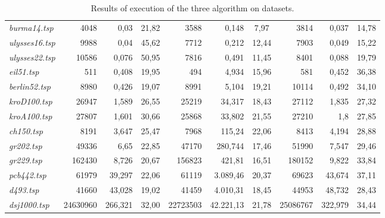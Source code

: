 \begin{landscape}
\begin{table}
\begin{tabular}{|l|r|r|c|r|r|c|r|r|c|}
    \textit{burma14.tsp}	& 4048	    & 0,03	    & 21,82 	& 3588	    & 0,148	    & 7,97      & 3814	    & 0,037	    & 14,78 \\
    \textit{ulysses16.tsp}	& 9988	    & 0,04	    & 45,62 	& 7712	    & 0,212	    & 12,44 	& 7903	    & 0,049	    & 15,22 \\
    \textit{ulysses22.tsp}	& 10586	    & 0,076	    & 50,95     & 7816	    & 0,491	    & 11,45     & 8401	    & 0,088	    & 19,79 \\
    \textit{eil51.tsp}	    & 511	    & 0,408	    & 19,95 	& 494	    & 4,934	    & 15,96 	& 581	    & 0,452	    & 36,38 \\
    \textit{berlin52.tsp}	& 8980	    & 0,426	    & 19,07 	& 8991	    & 5,104	    & 19,21 	& 10114	    & 0,492	    & 34,10 \\
    \textit{kroD100.tsp}    & 26947	    & 1,589	    & 26,55 	& 25219	    & 34,317	& 18,43 	& 27112	    & 1,835	    & 27,32 \\    
    \textit{kroA100.tsp}	& 27807	    & 1,601	    & 30,66 	& 25868	    & 33,802	& 21,55 	& 27210	    & 1,8       & 27,85 \\
    \textit{ch150.tsp}	    & 8191	    & 3,647	    & 25,47 	& 7968	    & 115,24	& 22,06 	& 8413	    & 4,194 	& 28,88 \\
    \textit{gr202.tsp}	    & 49336	    & 6,65  	& 22,85 	& 47170	    & 280,744	& 17,46 	& 51990	    & 7,547 	& 29,46 \\
    \textit{gr229.tsp}	    & 162430	& 8,726 	& 20,67 	& 156823	& 421,81	& 16,51     & 180152	& 9,822 	& 33,84 \\
    \textit{pcb442.tsp}	    & 61979	    & 39,297	& 22,06 	& 61119	    & 3.089,46	& 20,37 	& 69623	    & 43,674	& 37,11 \\
    \textit{d493.tsp}	    & 41660	    & 43,028	& 19,02 	& 41459	    & 4.010,31	& 18,45 	& 44953	    & 48,732	& 28,43 \\
    \textit{dsj1000.tsp}	& 24630960	& 266,321	& 32,00 	& 22723503	& 42.221,13	& 21,78 	& 25086767	& 322,979	& 34,44 \\

    \hline
    \end{tabular}
    \caption{Results of execution of the three algorithm on datasets.}
\end{table}
\end{landscape}

